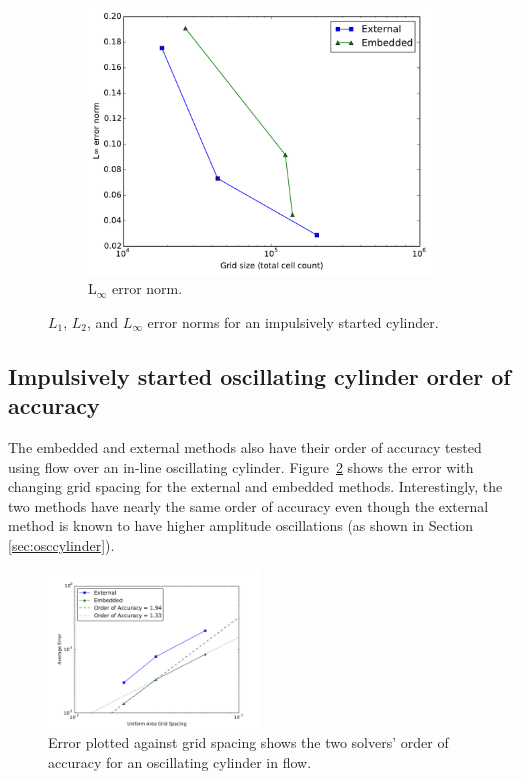 \documentclass[preprint,12pt,5p]{elsarticle}
\begin{document}
\begin{figure}[H]
	\begin{subfigure}{0.5\textwidth}
		\includegraphics[width=\linewidth]{Linf_error_norm}
		\caption{L$_\infty$ error norm.}
	\end{subfigure}
	\caption{$L_1$, $L_2$, and $L_\infty$ error norms for an impulsively started cylinder.}
	\label{fig:error norm}
\end{figure}

\subsection{Impulsively started oscillating cylinder order of accuracy}
The embedded and external methods also have their order of accuracy tested using flow over an in-line oscillating cylinder.  
Figure~\ref{fig:oscerror} shows the error with changing grid spacing for the external and embedded methods. 
Interestingly, the two methods have nearly the same order of accuracy even though the external method is known to have higher amplitude oscillations (as shown in Section \ref{sec:osccylinder}). 

\begin{figure}[!htb]
	\centering
	\includegraphics[width=0.5\textwidth]{error_oscflow}
	\caption{Error plotted against grid spacing shows the two solvers' order of accuracy for an oscillating cylinder in flow.}
	\label{fig:oscerror}
\end{figure}
\end{document}
